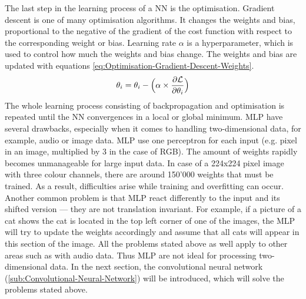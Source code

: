 The last step in the learning process of a \gls{NN} is the optimisation. Gradient descent is one of many optimisation algorithms. It changes the weights and bias, proportional to the negative of the gradient of the cost function with respect to the corresponding weight or bias. Learning rate $\alpha$ is a hyperparameter, which is used to control how much the weights and bias change. The weights and bias are updated with equations \ref{eq:Optimisation-Gradient-Descent-Weights}.
\begin{equation}
    \centering
    \theta_i = \theta_i - \Big(\alpha \times \frac{\partial \mathcal{L}}{\partial\theta_i}\Big)
    \label{eq:Optimisation-Gradient-Descent-Weights}
\end{equation}
The whole learning process consisting of backpropagation and optimisation is repeated until the \gls{NN} convergences in a local or global minimum.
\newline
\newline
\gls{MLP} have several drawbacks, especially when it comes to handling two-dimensional data, for example, audio or image data. \gls{MLP} use one perceptron for each input (e.g. pixel in an image, multiplied by 3 in the case of RGB). The amount of weights rapidly becomes unmanageable for large input data. In case of a 224x224 pixel image with three colour channels, there are around 150'000 weights that must be trained. As a result, difficulties arise while training and overfitting can occur. Another common problem is that \gls{MLP} react differently to the input and its shifted version — they are not translation invariant. For example, if a picture of a cat shows the cat is located in the top left corner of one of the images, the \gls{MLP} will try to update the weights accordingly and assume that all cats will appear in this section of the image. All the problems stated above as well apply to other areas such as with audio data. Thus \gls{MLP} are not ideal for processing two-dimensional data. In the next section, the convolutional neural network (\ref{sub:Convolutional-Neural-Network}) will be introduced, which will solve the problems stated above.

